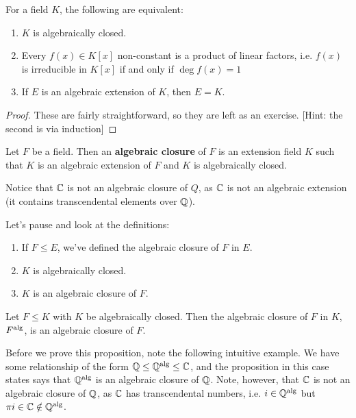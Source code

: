 \documentclass{../mathnotes}
\begin{document}
\begin{thm}
    For a field $K$, the following are equivalent:
    \begin{enumerate}
        \item $K$ is algebraically closed.
        \item Every $f(x)\in K[x]$ non-constant is a product of linear factors, i.e. $f(x)$ is irreducible in $K[x]$ if and only if
            $\deg f(x)=1$
        \item If $E$ is an algebraic extension of $K$, then $E=K$.
    \end{enumerate}
\end{thm}
\begin{proof}
    These are fairly straightforward, so they are left as an exercise. [Hint: the second is via induction]
\end{proof}

\begin{defn}
    Let $F$ be a field. Then an \textbf{algebraic closure} of $F$ is an extension field $K$ such that $K$ is an algebraic extension
    of $F$ and $K$ is algebraically closed.
\end{defn}
\begin{rem}
    Notice that $\mathbb{C}$ is not an algebraic closure of $Q$, as $\mathbb{C}$ is not an algebraic extension (it contains transcendental elements over $\mathbb{Q}$).
\end{rem}

Let's pause and look at the definitions:
\begin{enumerate}
    \item If $F\leq E$, we've defined the algebraic closure of $F$ in $E$.
    \item $K$ is algebraically closed.
    \item $K$ is an algebraic closure of $F$.
\end{enumerate}

\begin{thm}
    Let $F\leq K$ with $K$ be algebraically closed. Then the algebraic closure of $F$ in $K$, $F^{\rm alg}$, is an algebraic closure of $F$.
\end{thm}

\begin{exmp}
    Before we prove this proposition, note the following intuitive example.
    We have some relationship of the form $\mathbb{Q}\leq \mathbb{Q}^{\rm alg}\leq \mathbb{C}$, and the proposition in this case states says that
    $\mathbb{Q}^{\rm alg}$ is an algebraic closure of $\mathbb{Q}$. Note, however, that $\mathbb{C}$ is not an algebraic closure of $\mathbb{Q}$, as $\mathbb{C}$
    has transcendental numbers, i.e. $i\in\mathbb{Q}^{\rm alg}$ but $\pi i\in\mathbb{C}\notin\mathbb{Q}^{\rm alg}$.
\end{exmp}
\end{document}
